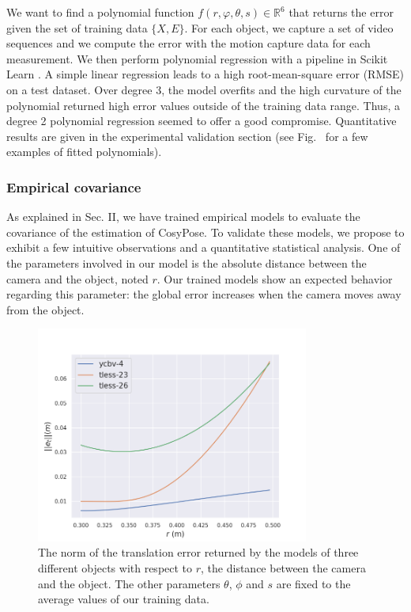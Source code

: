 We want to find a polynomial function $f(r, \varphi, \theta, s) \in \mathbb{R}^6$ that returns the error given the set of training data $\{X,E\}$. 
For each object, we capture a set of video sequences and we compute the error with the motion capture data for each measurement. 
We then perform polynomial regression with a pipeline in Scikit Learn \cite{scikit-learn}. A simple linear regression leads to a high root-mean-square error (RMSE) 
on a test dataset. Over degree 3, the model overfits and the high curvature of the polynomial returned high error values outside of the training data range. 
Thus, a degree 2 polynomial regression seemed to offer a good compromise.  Quantitative results are given in the experimental validation section 
(see Fig.~ for a few examples of fitted polynomials).







\subsubsection{Empirical covariance}

As explained in Sec. II, we have trained empirical models to evaluate the covariance of the estimation of CosyPose. 
To validate these models, we propose to exhibit a few intuitive observations and a quantitative statistical analysis. 
One of the parameters involved in our model is the absolute distance between the camera and the object, noted $r$. 
Our trained models show an expected behavior regarding this parameter: the global error increases when the camera moves away from the object. 
%
\begin{figure}[h]
  \centering 
  \includegraphics[width=0.8\textwidth]{figures/cosyslam/empirical_err.png}
  \caption{The norm of the translation error returned by the models of three different objects with respect to $r$, the distance between the camera and the object. 
            The other parameters $\theta$, $\phi$ and $s$ are fixed to the average values of our training data. }
  \label{fig:empirical_err}
\end{figure}

